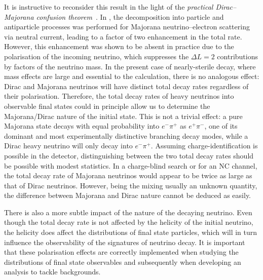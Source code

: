 It is instructive to reconsider this result in the light of the \emph{practical Dirac--Majorana confusion theorem}~\cite{Kayser:1981nw, %
	Kayser:1982br}.
In , the decomposition into particle and antiparticle processes was performed for %
Majorana neutrino--electron scattering via neutral current, leading to a factor of two enhancement in the total rate.
However, this enhancement was shown to be absent in practice due to the polarisation of the incoming neutrino, %
which suppresses the $\Delta L = 2$ contributions by factors of the neutrino mass. 
%
In the present case of nearly-sterile decay, where mass effects are large and essential to the calculation, %
there is no analogous effect: Dirac and Majorana neutrinos will have distinct total decay rates regardless of their polarisation. 
%
%
Therefore, the total decay rates of heavy neutrinos into observable final states could in principle allow us to determine %
the Majorana/Dirac nature of the initial state.
This is not a trivial effect: a pure Majorana state decays with equal probability into $e^-\pi^+$ as $e^+ \pi^-$, %
one of its dominant and most experimentally distinctive branching decay modes, while a Dirac heavy neutrino %
will only decay into $e^-\pi^+$.
%
Assuming charge-identification is possible in the detector, distinguishing between the two total decay rates %
should be possible with modest statistics. %
In a charge-blind search or for an NC channel, the total decay rate of Majorana neutrinos would appear to be twice as large as that of Dirac neutrinos.
However, being the mixing usually an unknown quantity, the difference between Majorana and Dirac nature cannot be deduced as easily.

There is also a more subtle impact of the nature of the decaying neutrino.
%
Even though the total decay rate is not affected by the helicity of the initial neutrino, %
the helicity does affect the distributions of final state particles, which will in turn influence the observability of %
the signatures of neutrino decay. 
%
It is important that these polarisation effects are correctly implemented when studying the distributions of %
final state observables and subsequently when developing an analysis to tackle backgrounds. 

